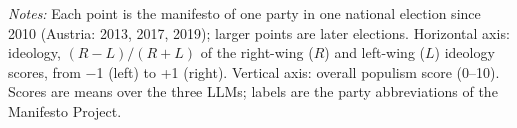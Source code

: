 \par\smallskip\begin{minipage}{\linewidth}\scriptsize\textit{Notes:} Each point is the manifesto of one party in one national election since 2010 (Austria: 2013, 2017, 2019); larger points are later elections. Horizontal axis: ideology, $(R-L)/(R+L)$ of the right-wing ($R$) and left-wing ($L$) ideology scores, from $-$1 (left) to +1 (right). Vertical axis: overall populism score (0--10). Scores are means over the three LLMs; labels are the party abbreviations of the Manifesto Project.\end{minipage}
